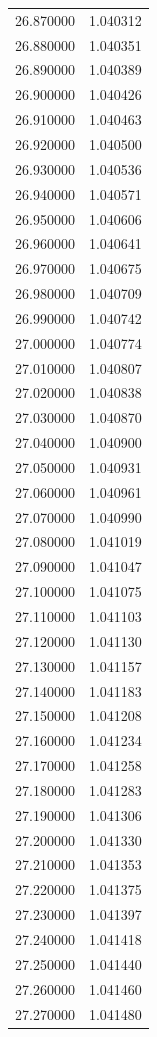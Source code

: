 \begin{tabular}{rr}
26.870000 & 1.040312 \\
26.880000 & 1.040351 \\
26.890000 & 1.040389 \\
26.900000 & 1.040426 \\
26.910000 & 1.040463 \\
26.920000 & 1.040500 \\
26.930000 & 1.040536 \\
26.940000 & 1.040571 \\
26.950000 & 1.040606 \\
26.960000 & 1.040641 \\
26.970000 & 1.040675 \\
26.980000 & 1.040709 \\
26.990000 & 1.040742 \\
27.000000 & 1.040774 \\
27.010000 & 1.040807 \\
27.020000 & 1.040838 \\
27.030000 & 1.040870 \\
27.040000 & 1.040900 \\
27.050000 & 1.040931 \\
27.060000 & 1.040961 \\
27.070000 & 1.040990 \\
27.080000 & 1.041019 \\
27.090000 & 1.041047 \\
27.100000 & 1.041075 \\
27.110000 & 1.041103 \\
27.120000 & 1.041130 \\
27.130000 & 1.041157 \\
27.140000 & 1.041183 \\
27.150000 & 1.041208 \\
27.160000 & 1.041234 \\
27.170000 & 1.041258 \\
27.180000 & 1.041283 \\
27.190000 & 1.041306 \\
27.200000 & 1.041330 \\
27.210000 & 1.041353 \\
27.220000 & 1.041375 \\
27.230000 & 1.041397 \\
27.240000 & 1.041418 \\
27.250000 & 1.041440 \\
27.260000 & 1.041460 \\
27.270000 & 1.041480 \\

\end{tabular}
